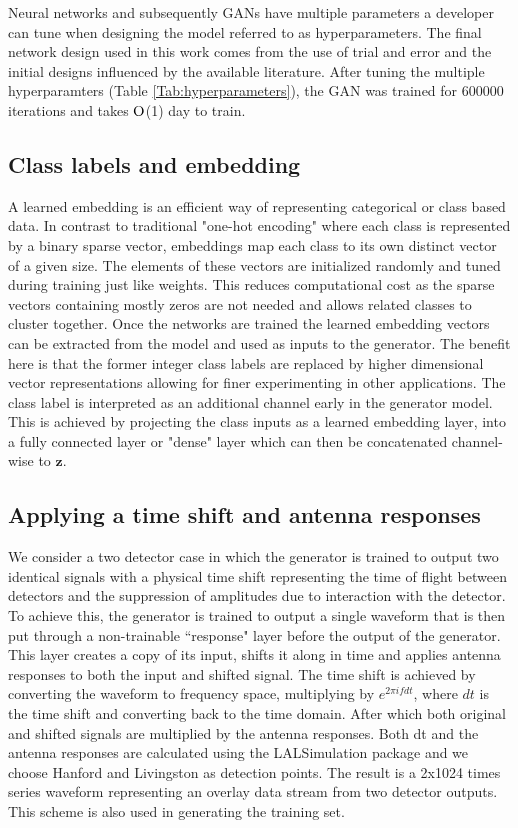 \documentclass[12pt]{iopart}
\begin{document}
Neural networks and subsequently GANs have multiple parameters a developer can tune when designing the model referred to as hyperparameters. The final network design used in this work comes from the use of trial and error and the initial designs influenced by the available literature. After tuning the multiple hyperparamters (Table \ref{Tab:hyperparameters}), the GAN was trained for 600000 iterations and takes $\mathord{\mathrm{O}}$(1) day to train.

\subsection{Class labels and embedding}
A learned embedding is an efficient way of representing categorical or class based data. In contrast to traditional "one-hot encoding" where each class is represented by a binary sparse vector, embeddings map each class to its own distinct vector of a given size. The elements of these vectors are initialized randomly and tuned during training just like weights. This reduces computational cost as the sparse vectors containing mostly zeros are not needed and allows related classes to cluster together. Once the networks are trained the learned embedding vectors can be extracted from the model and used as inputs to the generator. The benefit here is that the former integer class labels are replaced by higher dimensional vector representations allowing for finer experimenting in other applications. The class label is interpreted as an additional channel early in the generator model. This is achieved by projecting the class inputs as a learned embedding layer, into a fully connected layer or "dense" layer which can then be concatenated channel-wise to $\textbf{z}$. 

\subsection{Applying a time shift and antenna responses}
We consider a two detector case in which the generator is trained to output two identical signals with a physical time shift representing the time of flight between detectors and the suppression of amplitudes due to interaction with the detector. To achieve this, the generator is trained to output a single waveform that is then put through a non-trainable ``response" layer before the output of the generator. This layer creates a copy of its input, shifts it along in time and applies antenna responses to both the input and shifted signal. The time shift is achieved by converting the waveform to frequency space, multiplying by $e^{2 \pi i f dt}$, where $dt$ is the time shift and converting back to the time domain. After which both original and shifted signals are multiplied by the antenna responses. Both dt and the antenna responses are calculated using the LALSimulation \cite{lalsuite} package and we choose Hanford and Livingston as detection points. The result is a 2x1024 times series waveform representing an overlay data stream from two detector outputs. This scheme is also used in generating the training set. 
\end{document}
